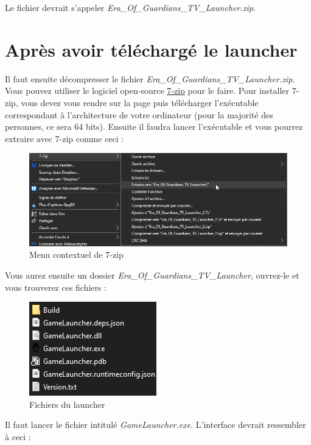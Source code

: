 \documentclass[a4paper, 10pt]{article}
\begin{document}
	Le fichier devrait s'appeler \textit{Era\_Of\_Guardians\_TV\_Launcher.zip}.
	
	\section{Après avoir téléchargé le launcher}
	Il faut ensuite décompresser le fichier \textit{Era\_Of\_Guardians\_TV\_Launcher.zip}. Vous pouvez utiliser le logiciel open-source \href{https://www.7-zip.fr/}{7-zip} pour le faire. Pour installer 7-zip, vous devez vous rendre sur la page puis télécharger l'exécutable correspondant à l'architecture de votre ordinateur (pour la majorité des personnes, ce sera 64 bits). Ensuite il faudra lancer l'exécutable et vous pourrez extraire avec 7-zip comme ceci :
	
	\begin{figure}[ht]
		\centering
		\includegraphics[scale=0.6]{images/7zip_menu.png}
		\caption{Menu contextuel de 7-zip}
	\end{figure}
	
	Vous aurez ensuite un dossier \textit{Era\_Of\_Guardians\_TV\_Launcher}, ouvrez-le et vous trouverez ces 
	fichiers : 
	
	\begin{figure}[ht]
		\centering
		\includegraphics[scale=0.8]{images/fichiers.png}
		\caption{Fichiers du launcher}
	\end{figure}

	Il faut lancer le fichier intitulé \textit{GameLauncher.exe}. L'interface devrait ressembler à ceci :
	
\end{document}
